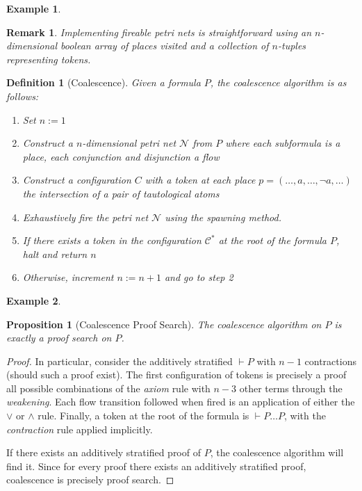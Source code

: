 \documentclass{article}
\def\seteq{:=}
\theoremstyle{indented}
\newtheorem{definition}[sec-ctr]{Definition}
\newtheorem{proposition}[sec-ctr]{Proposition}
\newtheorem*{example*}{Example}
\newtheorem{remark}[sec-ctr]{Remark}
\begin{document}
        \begin{example*}
        \end{example*}

        \begin{remark}
            Implementing fireable petri nets is straightforward using an $n$-dimensional boolean array of places visited and a collection of $n$-tuples representing tokens.
        \end{remark}

        
        \begin{definition}[Coalescence]
            Given a formula $P$, the coalescence algorithm is as follows:
            \begin{enumerate}[noitemsep]
                \item Set  $n \seteq 1$
                \item Construct a $n$-dimensional petri net $\mathcal{N}$ from $P$ where each subformula is a place, each conjunction and disjunction a flow
                \item Construct a configuration $C$ with a token at each place $p = (\ldots, a, \ldots, \neg a, \ldots)$ the intersection of a pair of tautological atoms
                \item Exhaustively fire the petri net $\mathcal{N}$ using the \textit{spawning} method.
                \item If there exists a token in the configuration $\mathcal{C^*}$ at the root of the formula $P$, halt and return $n$
                \item Otherwise, increment $n \seteq n + 1$ and go to step 2
            \end{enumerate}
        \end{definition}

        \begin{example*}
        \end{example*}


        \begin{proposition}[Coalescence Proof Search]
            The coalescence algorithm on $P$ is exactly a proof search on $P$.
        \end{proposition}

        \begin{proof}
            In particular, consider the additively stratified $\vdash P$ with $n - 1$ contractions (should such a proof exist).
            The first configuration of tokens is precisely a proof all possible combinations of the \textit{axiom} rule with $n - 3$ other terms through the \textit{weakening}.
            Each flow transition followed when fired is an application of either the $\vee$ or $\wedge$ rule.
            Finally, a token at the root of the formula is $\vdash P \ldots P$, with the \textit{contraction} rule applied implicitly.

            If there exists an additively stratified proof of $P$, the coalescence algorithm will find it.
            Since for every proof there exists an additively stratified proof, coalescence is precisely proof search.
        \end{proof}
 
\end{document}

